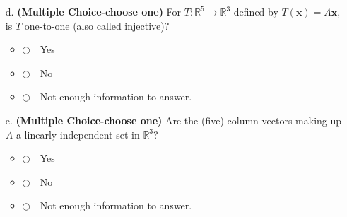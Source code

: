 \documentclass[12pt]{extarticle}
\newcommand{\chooseone}{{\Large$\Circle$\ \ }}
\begin{document}
\begin{enumerate}
\begin{itemize}
     \vfill


\item[d.] \textbf{(Multiple Choice-choose one)} For $T:\mathbb{R}^5\to\mathbb{R}^3$ defined by $T(\mathbf{x})=A\mathbf{x}$, is $T$ one-to-one (also called injective)?
\begin{itemize}[label={}]
\item \chooseone Yes
\item \chooseone No
\item \chooseone Not enough information to answer.
\end{itemize}   


\vfill
\item[e.] \textbf{(Multiple Choice-choose one)}  Are the (five) column vectors making up $A$ a linearly independent set in $\mathbb{R}^3$?
\begin{itemize}[label={}]
\item \chooseone Yes
\item \chooseone No
\item \chooseone Not enough information to answer.
\end{itemize}    

\end{itemize}


    
    





    


\newpage


    


    

    
    
    
        \newpage
\end{enumerate}
\end{document}

